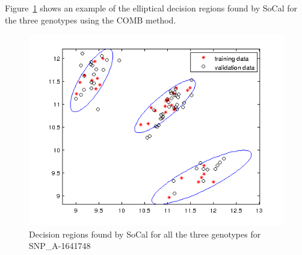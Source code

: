 \documentclass{scrartcl}
\begin{document}
\par
Figure~\ref{fig:method_classification} shows an example of the elliptical
decision regions found by SoCal for the three genotypes using the COMB method. 
\begin{figure}[H]
    \centering
    \includegraphics[scale=0.75]
    {result_figures/result_classification.png}
    \caption{Decision regions found by SoCal for all the
    three genotypes for SNP\_A-1641748}
    \label{fig:method_classification}
\end{figure}
\end{document}
